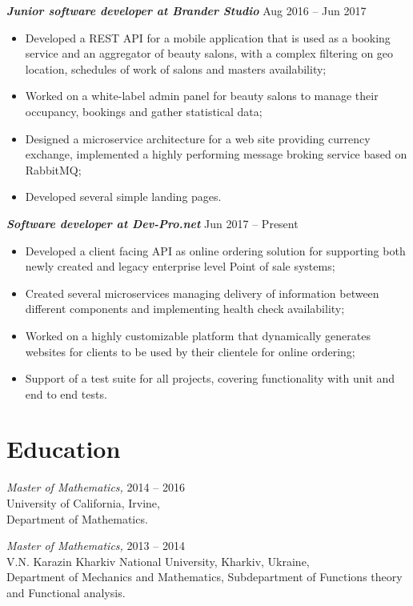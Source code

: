 \documentclass[margin, 10pt]{res} %
\begin{document}
\begin{resume}
{\sl \bf Junior software developer at Brander Studio} \hfill Aug 2016 -- Jun 2017
\begin{itemize}
\item Developed a REST API  for a mobile application that is used as a booking service and an aggregator of beauty salons, with a complex filtering on geo location, schedules of work of salons and masters availability;
\item Worked on a white-label admin panel for beauty salons to manage their occupancy, bookings and gather statistical data;
\item Designed a microservice architecture for a web site providing currency exchange, implemented a highly performing message broking service based on RabbitMQ;
\item Developed several simple landing pages.
\end{itemize} 
{\sl \bf  Software developer at Dev-Pro.net } \hfill Jun 2017 -- Present
\begin{itemize}
\item Developed a client facing API  as online ordering solution for supporting both newly created and legacy enterprise level Point of sale systems;
\item Created several microservices managing delivery of information between different components and implementing health check availability;
\item Worked on a highly customizable platform that dynamically generates websites for clients to be used by their clientele for online ordering;
\item Support of a test suite for all projects, covering functionality with unit and end to end tests.
\end{itemize} 

\section{Education}
{\sl Master of Mathematics,} \hfill 2014 --  2016\\
University of California, Irvine, \\
Department of Mathematics.

{\sl Master of Mathematics,} \hfill  2013 -- 2014\\
 V.N. Karazin Kharkiv National University, Kharkiv, Ukraine,\\
Department of Mechanics and Mathematics, Subdepartment 
of Functions theory and Functional analysis. 


\end{resume}
\end{document}
